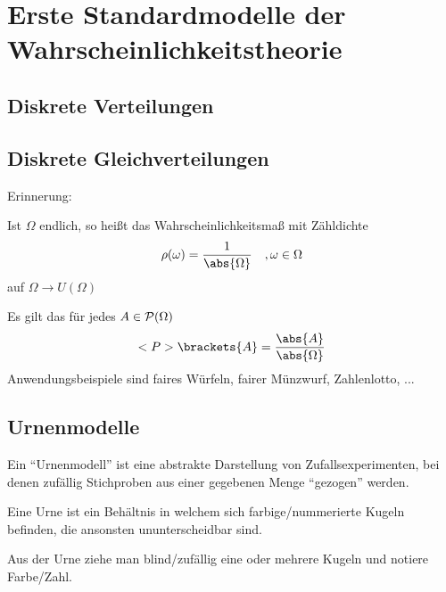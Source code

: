 \chapter{Erste Standardmodelle der Wahrscheinlichkeitstheorie}
\section*{Diskrete Verteilungen}

\section{Diskrete Gleichverteilungen}


Erinnerung:
\begin{*erinnerung}[\propref{1_10}]
	Ist $\Omega$ endlich, so heißt das Wahrscheinlichkeitsmaß mit Zähldichte
	\begin{align}
		\rho(\omega) = \frac{1}{\abs{\Omega}}\quad, \omega \in \Omega\notag
	\end{align}
	 auf $\Omega \to U(\Omega)$
\end{*erinnerung}
Es gilt das für jedes $A \in \mathcal{P}(\Omega)$
\begin{align}
	\probp\brackets{A} = \frac{\abs{A}}{\abs{\Omega}} \notag
\end{align}
Anwendungsbeispiele sind faires Würfeln, fairer Münzwurf, Zahlenlotto, ...

\section{Urnenmodelle}

Ein ``Urnenmodell'' ist eine abstrakte Darstellung von Zufallsexperimenten, bei denen zufällig Stichproben aus einer gegebenen Menge ``gezogen'' werden.
\begin{*definition}[Urne]
	Eine Urne ist ein Behältnis in welchem sich farbige/nummerierte Kugeln befinden, die ansonsten ununterscheidbar sind.
\end{*definition}
Aus der Urne ziehe man blind/zufällig eine oder mehrere Kugeln und notiere Farbe/Zahl.

